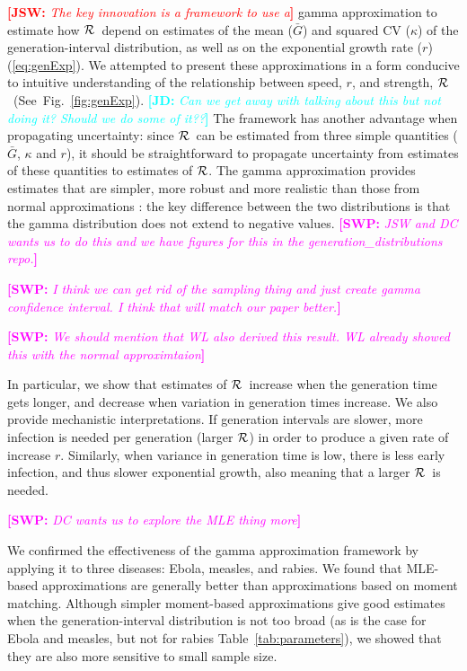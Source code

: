\documentclass[12pt,]{article}
\newcommand{\RR}{\ensuremath{{\cal R}}}
\newcommand{\eref}[1]{(\ref{eq:#1})}
\newcommand{\fref}[1]{Fig.~\ref{fig:#1}}
\newcommand{\tref}[1]{Table~\ref{tab:#1}}
\newcommand{\comment}[3]{\textcolor{#1}{\textbf{[#2: }\textit{#3}\textbf{]}}}
\newcommand{\jd}[1]{\comment{cyan}{JD}{#1}}
\newcommand{\swp}[1]{\comment{magenta}{SWP}{#1}}
\newcommand{\jsw}[1]{\comment{red}{JSW}{#1}}
\begin{document}
\jsw{The key innovation is a framework to use a} gamma approximation \cite{NishCast09} to estimate how \RR\ depend on estimates of the mean ($\bar G$) and squared CV ($\kappa$) of the generation-interval distribution, as well as on the exponential growth rate ($r$) \eref{genExp}. 
We attempted to present these approximations in a form conducive to intuitive understanding of the relationship between speed, $r$, and strength, \RR\ (See~\fref{genExp}).
\jd{Can we get away with talking about this but not doing it? Should we do some of it??}
The framework has another advantage when propagating uncertainty: since \RR\ can be estimated from three simple quantities ($\bar G$, $\kappa$ and $r$), it should be straightforward to propagate uncertainty from estimates of these quantities to estimates of \RR.
The gamma approximation provides estimates that are simpler, more robust and more realistic than those from normal approximations \cite{WallLips07}:
the key difference between the two distributions is that the gamma distribution does not extend to negative values.
\swp{JSW and DC wants us to do this and we have figures for this in the generation\_distributions repo.}

\swp{I think we can get rid of the sampling thing and just create gamma confidence interval. I think that will match our paper better.}

\swp{We should mention that WL also derived this result. WL already showed this with the normal approximtaion}

In particular, we show that estimates of \RR\ increase when the generation time gets longer, and decrease when variation in generation times increase. We also provide mechanistic interpretations. If generation intervals are slower, more infection is needed per generation (larger \RR)  in order to produce a given rate of increase $r$. Similarly, when variance in generation time is low, there is less early infection, and thus slower exponential growth, also meaning that a larger \RR\ is needed. 

\swp{DC wants us to explore the MLE thing more}

We confirmed the effectiveness of the gamma approximation framework by applying it to three diseases: Ebola, measles, and rabies. 
We found that MLE-based approximations are generally better than approximations based on moment matching. Although simpler moment-based approximations give good estimates when the generation-interval distribution is not too broad (as is the case for Ebola and measles, but not for rabies \tref{parameters}), we showed that they are also more sensitive to small sample size.
\end{document}
